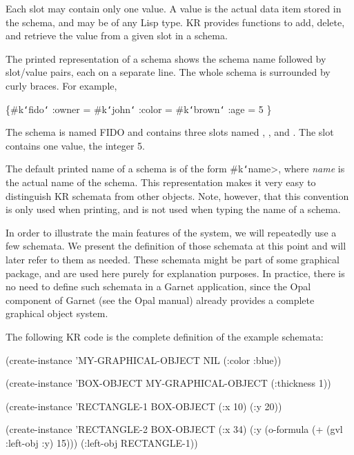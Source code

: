 Each slot may contain only one value.
A value is the actual data item stored in the schema, and may
be of any Lisp type.  KR provides functions to add, delete, and retrieve
the value from a given slot in a schema.

The printed representation of a schema shows the schema name followed by
slot/value pairs, each on a separate line.  The whole schema is surrounded
by curly braces.  For example,
\begin{programexample}
\{\#k{\tt\char`\<}fido{\tt\char`\>}
  :owner =  \#k{\tt\char`\<}john{\tt\char`\>}
  :color =  \#k{\tt\char`\<}brown{\tt\char`\>}
  :age =  5
\}
\end{programexample}

The schema is named FIDO and contains three slots named
, , and .  The slot  contains one
value, the integer 5.

The default printed name of a schema is of the form {\sc \#k{\tt\char`\<}name>}, where
{\it name} is the actual name of the schema.  This representation makes it
very easy to distinguish KR schemata from other objects.  Note, however,
that this convention is only used when printing, and is not used when
typing the name of a schema.



In order to illustrate the main features of the system, we will repeatedly
use a few schemata.  We present the definition of those schemata at this
point and will later refer to them as needed.  These schemata might be part
of some graphical package, and are used here purely for explanation
purposes.  In practice, there is no need to define such schemata in a
Garnet application, since the Opal component of Garnet (see the Opal
manual) already provides a complete graphical object system.

The following KR code is the complete definition of the example schemata:
\label{kr-examples}

\begin{programexample}
(create-instance 'MY-GRAPHICAL-OBJECT NIL
  (:color :blue))

(create-instance 'BOX-OBJECT MY-GRAPHICAL-OBJECT
  (:thickness 1))

(create-instance 'RECTANGLE-1 BOX-OBJECT
  (:x 10)
  (:y 20))

(create-instance 'RECTANGLE-2 BOX-OBJECT
  (:x 34)
  (:y (o-formula (+ (gvl :left-obj :y) 15)))
  (:left-obj RECTANGLE-1))
\end{programexample}

